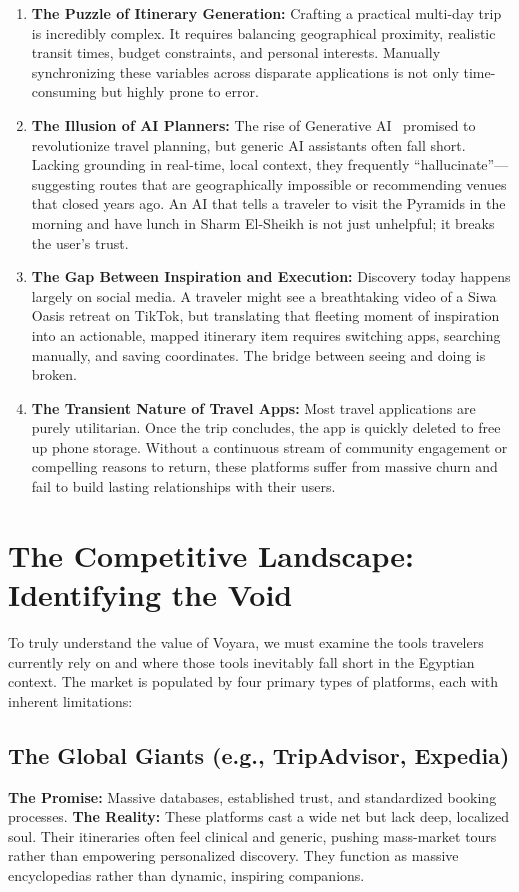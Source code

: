 \begin{enumerate}
    \item \textbf{The Puzzle of Itinerary Generation:} Crafting a practical multi-day trip is incredibly complex. It requires balancing geographical proximity, realistic transit times, budget constraints, and personal interests. Manually synchronizing these variables across disparate applications is not only time-consuming but highly prone to error.
    
    \item \textbf{The Illusion of AI Planners:} The rise of Generative AI~\cite{brown2020language} promised to revolutionize travel planning, but generic AI assistants often fall short. Lacking grounding in real-time, local context, they frequently ``hallucinate''---suggesting routes that are geographically impossible or recommending venues that closed years ago. An AI that tells a traveler to visit the Pyramids in the morning and have lunch in Sharm El-Sheikh is not just unhelpful; it breaks the user's trust.
    
    \item \textbf{The Gap Between Inspiration and Execution:} Discovery today happens largely on social media. A traveler might see a breathtaking video of a Siwa Oasis retreat on TikTok, but translating that fleeting moment of inspiration into an actionable, mapped itinerary item requires switching apps, searching manually, and saving coordinates. The bridge between seeing and doing is broken.
    
    \item \textbf{The Transient Nature of Travel Apps:} Most travel applications are purely utilitarian. Once the trip concludes, the app is quickly deleted to free up phone storage. Without a continuous stream of community engagement or compelling reasons to return, these platforms suffer from massive churn and fail to build lasting relationships with their users.
\end{enumerate}

\section{The Competitive Landscape: Identifying the Void}
To truly understand the value of Voyara, we must examine the tools travelers currently rely on and where those tools inevitably fall short in the Egyptian context. The market is populated by four primary types of platforms, each with inherent limitations:

\subsection{The Global Giants (e.g., TripAdvisor, Expedia)}
\textbf{The Promise:} Massive databases, established trust, and standardized booking processes.
\textbf{The Reality:} These platforms cast a wide net but lack deep, localized soul. Their itineraries often feel clinical and generic, pushing mass-market tours rather than empowering personalized discovery. They function as massive encyclopedias rather than dynamic, inspiring companions.

